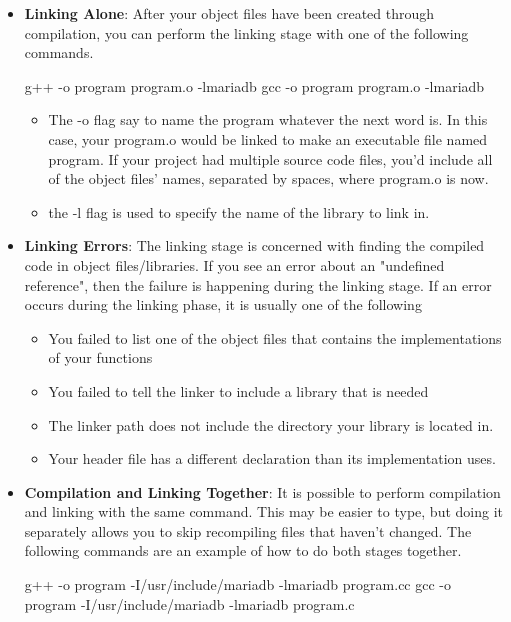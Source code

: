 \documentclass{report}
\begin{document}
\begin{itemize}
\begin{itemize}
            \end{itemize}
        \item \textbf{Linking Alone}: After your object files have been created through compilation, you can perform the linking stage with one of the following commands.
            \bigbreak \noindent 
            \begin{cppcode}
                g++ -o program program.o -lmariadb
                gcc -o program program.o -lmariadb
            \end{cppcode}
            \begin{itemize}
                \item The -o flag say to name the program whatever the next word is. In this case, your program.o would be linked to make an executable file named program. If your project had multiple source code files, you'd include all of the object files' names, separated by spaces, where program.o is now.
                \item the -l flag is used to specify the name of the library to link in.
            \end{itemize}
        \item \textbf{Linking Errors}: The linking stage is concerned with finding the compiled code in object files/libraries. If you see an error about an "undefined reference", then the failure is happening during the linking stage. If an error occurs during the linking phase, it is usually one of the following
            \begin{itemize}
                \item You failed to list one of the object files that contains the implementations of your functions
                \item You failed to tell the linker to include a library that is needed
                \item The linker path does not include the directory your library is located in.
                \item Your header file has a different declaration than its implementation uses.
            \end{itemize}
        \item \textbf{Compilation and Linking Together}: It is possible to perform compilation and linking with the same command. This may be easier to type, but doing it separately allows you to skip recompiling files that haven't changed. The following commands are an example of how to do both stages together.
            \bigbreak \noindent 
            \begin{cppcode}
                g++ -o program -I/usr/include/mariadb -lmariadb program.cc
                gcc -o program -I/usr/include/mariadb -lmariadb program.c
            \end{cppcode}

    \end{itemize}
\end{document}
